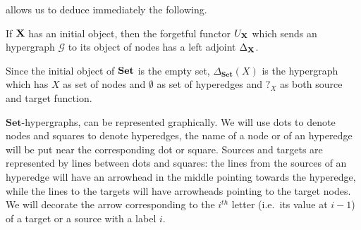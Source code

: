 \documentclass[runningheads,envcountsect]{llncs}
\newcommand{\Set}{\mathbf{Set}}
\def\X{\textbf {\textup{X}}}
\newcommand{\catname}[1]{\textbf{\textup{#1}}}
\begin{document}
 allows us to deduce immediately the following.

\begin{proposition}\label{cor:left} If $\X$ has an initial object, then the forgetful functor $U_{\X}$ which sends an hypergraph $\mathcal{G}$ to its object of nodes has a left adjoint $\Delta_{\X}$.
\end{proposition}

\begin{example}Since the initial object of $\catname{Set}$ is the empty set,  $\Delta_{\Set}(X)$ is the hypergraph which has $X$ as set of nodes and $\emptyset$ as set of hyperedges and $?_X$ as both source and target function.
\end{example}


$\Set$-hypergraphs,  can be represented graphically. We will use dots to denote nodes and squares to denote hyperedges, the name of a node or of an hyperedge will be put near the corresponding dot or square. Sources and targets are represented by lines between dots and squares: the lines from the sources of an hyperedge will have an arrowhead in the middle pointing towards the hyperedge, while the lines to the targets will have arrowheads pointing to the target nodes.  We will decorate the arrow corresponding to the $i^{th}$ letter (i.e.~its value at $i-1$) of a target or a source with a label $i$.
\end{document}
